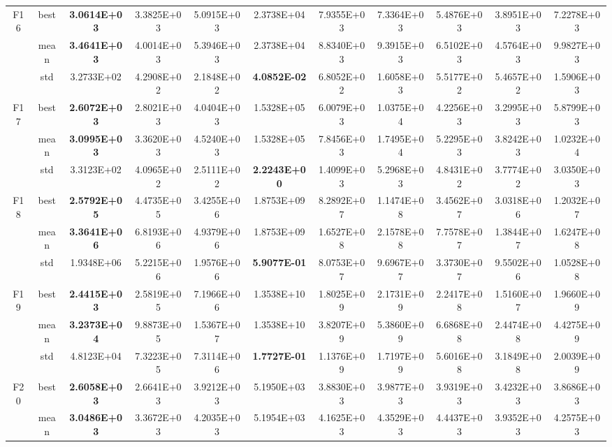 \documentclass{wzuthesis}
\begin{document}
\begin{longtable}{ccccccccccc}
\multirow{3}[0]{*}{F16} & best  & \textbf{3.0614E+03} & 3.3825E+03 & 5.0915E+03 & 2.3738E+04 & 7.9355E+03 & 7.3364E+03 & 5.4876E+03 & 3.8951E+03 & 7.2278E+03 \\
          & mean  & \textbf{3.4641E+03} & 4.0014E+03 & 5.3946E+03 & 2.3738E+04 & 8.8340E+03 & 9.3915E+03 & 6.5102E+03 & 4.5764E+03 & 9.9827E+03 \\
          & std   & 3.2733E+02 & 4.2908E+02 & 2.1848E+02 & \textbf{4.0852E-02} & 6.8052E+02 & 1.6058E+03 & 5.5177E+02 & 5.4657E+02 & 1.5906E+03 \\
\multirow{3}[0]{*}{F17} & best  & \textbf{2.6072E+03} & 2.8021E+03 & 4.0404E+03 & 1.5328E+05 & 6.0079E+03 & 1.0375E+04 & 4.2256E+03 & 3.2995E+03 & 5.8799E+03 \\
          & mean  & \textbf{3.0995E+03} & 3.3620E+03 & 4.5240E+03 & 1.5328E+05 & 7.8456E+03 & 1.7495E+04 & 5.2295E+03 & 3.8242E+03 & 1.0232E+04 \\
          & std   & 3.3123E+02 & 4.0965E+02 & 2.5111E+02 & \textbf{2.2243E+00} & 1.4099E+03 & 5.2968E+03 & 4.8431E+02 & 3.7774E+02 & 3.0350E+03 \\
\multirow{3}[0]{*}{F18} & best  & \textbf{2.5792E+05} & 4.4735E+05 & 3.4255E+06 & 1.8753E+09 & 8.2892E+07 & 1.1474E+08 & 3.4562E+07 & 3.0318E+06 & 1.2032E+07 \\
          & mean  & \textbf{3.3641E+06} & 6.8193E+06 & 4.9379E+06 & 1.8753E+09 & 1.6527E+08 & 2.1578E+08 & 7.7578E+07 & 1.3844E+07 & 1.6247E+08 \\
          & std   & 1.9348E+06 & 5.2215E+06 & 1.9576E+06 & \textbf{5.9077E-01} & 8.0753E+07 & 9.6967E+07 & 3.3730E+07 & 9.5502E+06 & 1.0528E+08 \\
\multirow{3}[0]{*}{F19} & best  & \textbf{2.4415E+03} & 2.5819E+05 & 7.1966E+06 & 1.3538E+10 & 1.8025E+09 & 2.1731E+09 & 2.2417E+08 & 1.5160E+07 & 1.9660E+09 \\
          & mean  & \textbf{3.2373E+04} & 9.8873E+05 & 1.5367E+07 & 1.3538E+10 & 3.8207E+09 & 5.3860E+09 & 6.6868E+08 & 2.4474E+08 & 4.4275E+09 \\
          & std   & 4.8123E+04 & 7.3223E+05 & 7.3114E+06 & \textbf{1.7727E-01} & 1.1376E+09 & 1.7197E+09 & 5.6016E+08 & 3.1849E+08 & 2.0039E+09 \\
\multirow{3}[0]{*}{F20} & best  & \textbf{2.6058E+03} & 2.6641E+03 & 3.9212E+03 & 5.1950E+03 & 3.8830E+03 & 3.9877E+03 & 3.9319E+03 & 3.4232E+03 & 3.8686E+03 \\
          & mean  & \textbf{3.0486E+03} & 3.3672E+03 & 4.2035E+03 & 5.1954E+03 & 4.1625E+03 & 4.3529E+03 & 4.4437E+03 & 3.9352E+03 & 4.2575E+03 \\

\end{longtable}
\end{document}
